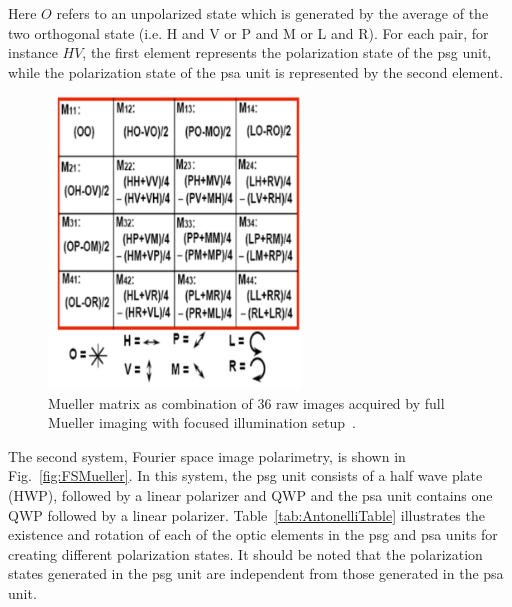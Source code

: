 Here $O$ refers to an unpolarized state which is generated by the average of the two orthogonal state (i.e. H and V or P and M or L and R).
For each pair, for instance $HV$, the first element represents the polarization state of the \ac{psg} unit, while the polarization state of the \ac{psa} unit is represented by the second element.
\begin{figure}
\begin{center}
\includegraphics[width = 0.6\textwidth ]{Chapter4/Figures/FIMuellermat.png}
\end{center}
\caption[Mueller matrix obtained by full Mueller imaging with focused illumination system~\cite{antonelli2011biomedical}]{Mueller matrix as combination of 36 raw images acquired by full Mueller imaging with focused illumination setup~\cite{antonelli2011biomedical}.}
\label{fig:FIMuellermat}
\end{figure}

The second system, Fourier space image polarimetry, is shown in Fig.~\ref{fig:FSMueller}.
In this system, the \ac{psg} unit consists of a half wave plate (HWP), followed by a linear polarizer and QWP and the \ac{psa} unit contains one QWP followed by a linear polarizer.
Table~\ref{tab:AntonelliTable} illustrates the existence and rotation of each of the optic elements in the \ac{psg} and \ac{psa} units for creating different polarization states.
It should be noted that the polarization states generated in the \ac{psg} unit are independent from those generated in the \ac{psa} unit.

